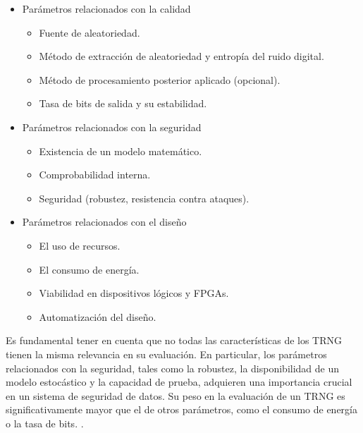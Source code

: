             \begin{itemize}[noitemsep]
                \item Parámetros relacionados con la calidad
                    \begin{itemize}[noitemsep]
                        \item Fuente de aleatoriedad.
                        \item Método de extracción de aleatoriedad y entropía del ruido digital.
                        \item Método de procesamiento posterior aplicado (opcional).
                        \item Tasa de bits de salida y su estabilidad.
                    \end{itemize}
                \item Parámetros relacionados con la seguridad
                    \begin{itemize}[noitemsep]
                        \item Existencia de un modelo matemático.
                        \item Comprobabilidad interna.
                        \item Seguridad (robustez, resistencia contra ataques).
                    \end{itemize}
                \item Parámetros relacionados con el diseño
                    \begin{itemize}[noitemsep]
                        \item El uso de recursos.
                        \item El consumo de energía.
                        \item Viabilidad en dispositivos lógicos y FPGAs.
                        \item Automatización del diseño.
                    \end{itemize}
            \end{itemize}

            Es fundamental tener en cuenta que no todas las características de los TRNG tienen la misma relevancia en su evaluación. En particular, los parámetros relacionados con la seguridad, tales como la robustez, la disponibilidad de un modelo estocástico y la capacidad de prueba, adquieren una importancia crucial en un sistema de seguridad de datos. Su peso en la evaluación de un TRNG es significativamente mayor que el de otros parámetros, como el consumo de energía o la tasa de bits. \cite{Badrignans2011}.

